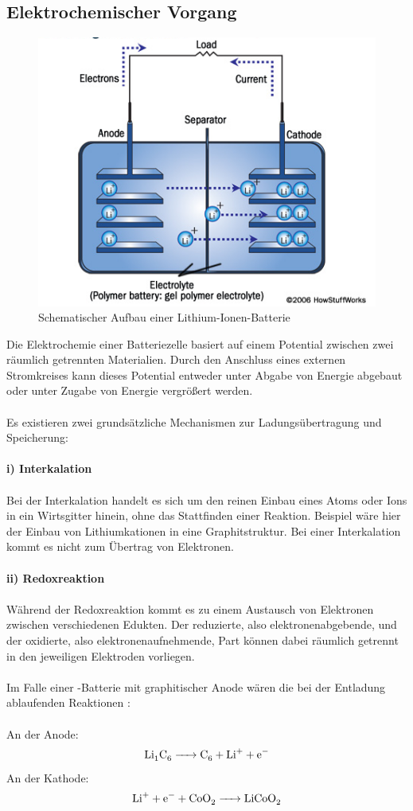 \documentclass[a4paper, 11pt, headsepline,footsepline,twoside,abstract]{scrbook}
\begin{document}
\subsection{Elektrochemischer Vorgang}
\begin{figure}
	\centering
	\includegraphics[width=0.6\columnwidth]{images/Schematischer_Aufbau_Li_Ionen.png}
	\caption{Schematischer Aufbau einer Lithium-Ionen-Batterie}
	\label{schema_li_ionen}
\end{figure}
Die Elektrochemie einer Batteriezelle basiert auf einem Potential zwischen zwei räumlich getrennten Materialien. Durch den Anschluss eines externen Stromkreises kann dieses Potential entweder unter Abgabe von Energie abgebaut oder unter Zugabe von Energie vergrößert werden. 
\\\\
Es existieren zwei grundsätzliche Mechanismen zur Ladungsübertragung und Speicherung:
\\\\
\textbf{i) Interkalation}
\\\\
Bei der Interkalation handelt es sich um den reinen Einbau eines Atoms oder Ions in ein Wirtsgitter hinein, ohne das Stattfinden einer Reaktion. Beispiel wäre hier der Einbau von Lithiumkationen in eine Graphitstruktur. Bei einer Interkalation kommt es nicht zum Übertrag von Elektronen.
\\\\
\textbf{ii) Redoxreaktion}
\\\\
Während der Redoxreaktion kommt es zu einem Austausch von Elektronen zwischen verschiedenen Edukten. Der reduzierte, also elektronenabgebende, und der oxidierte, also elektronenaufnehmende, Part können dabei räumlich getrennt in den jeweiligen Elektroden vorliegen.
\\\\
Im Falle einer -Batterie mit graphitischer Anode wären die bei der Entladung ablaufenden Reaktionen \cite{minakshi2008book}:
\\\\
An der Anode:\\ %
\begin{equation}
	\ce{Li1C6 -> C6 + Li+ + e-}
\end{equation}
An der Kathode:\\ %
\begin{equation}
	\ce{Li+ + e- + CoO2 -> LiCoO2}
\end{equation}
\end{document}

